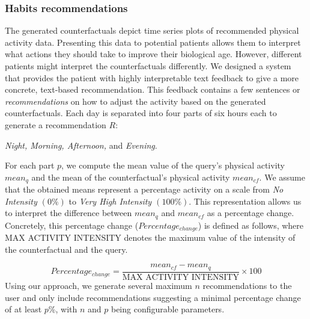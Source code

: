 \subsubsection{Habits recommendations}
The generated counterfactuals depict time series plots of recommended physical activity data. Presenting this data to potential patients allows them to interpret what actions they should take to improve their biological age. However, different patients might interpret the counterfactuals differently. 
We designed a system that provides the patient with highly interpretable text feedback to give a more concrete, text-based recommendation. This feedback contains a few sentences or \textit{recommendations} on how to adjust the activity based on the generated counterfactuals. Each day is separated into four parts of six hours each to generate a recommendation $R$:
\begin{center}
    \textit{Night, Morning, Afternoon,} and \textit{Evening}.
\end{center}
For each part $p$, we compute the mean value of the query's physical activity $mean_q$ and the mean of the counterfactual's physical activity $mean_{cf}$. We assume that the obtained means represent a percentage activity on a scale from \textit{No Intensity $(0\%)$} to \textit{Very High Intensity $(100\%)$}. This representation allows us to interpret the difference between $mean_q$ and $mean_{cf}$ as a 
 percentage change. Concretely, this percentage change ($Percentage_{change}$) is defined as follows, where MAX ACTIVITY INTENSITY denotes the maximum value of the intensity of the counterfactual and the query.

\begin{equation}
    Percentage_{change} = \frac{mean_{cf} - mean_{q}}{\text{MAX ACTIVITY INTENSITY}} \times 100
\end{equation}
Using our approach, we generate several maximum $n$ recommendations to the user and only include recommendations suggesting a minimal percentage change of at least $p$\%, with $n$ and $p$ being configurable parameters.

